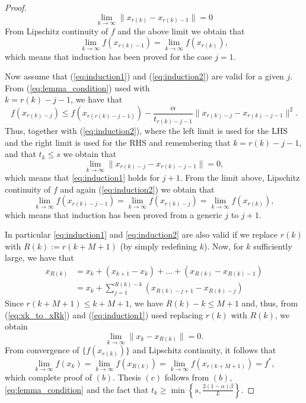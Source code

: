 \documentclass[10pt,a4paper]{article}
\begin{document}
\begin{proof}
	$$ \displaystyle \lim_{k \to \infty} \| x_{r(k)} -x_{r(k)-1}\| = 0$$
	From Lipschitz continuity of $f$ and the above limit we obtain that
	\begin{equation*}
		\displaystyle \lim_{k\to\infty} f(x_{r(k) -1}) = \displaystyle \lim_{k\to\infty} f(x_{r(k) }),
	\end{equation*}
	which means that induction has been proved for the case $j=1$.
	\par Now assume that (\ref{eq:induction1}) and (\ref{eq:induction2}) are valid for a given $j$. From (\ref{eq:lemma_condition}) used with\\ $k = r(k) -j -1$, we have that
	$$ f(x_{r(k) -j}) \leq f(x_{r(r(k)-j -1)}) - \frac{\alpha}{t_{r(k)-j-1}}\| x_{r(k)-j} - x_{r(k)-j-1}\|^2.$$
	Thus, together with (\ref{eq:induction2}), where the left limit is used for the LHS and the right limit is used for the RHS and remembering that $k=  r(k) -j -1$, and that $t_k\leq s$ we obtain that
	$$ \displaystyle \lim_{k \to \infty} \| x_{r(k)-j} - x_{r(k)-j-1} \| = 0,$$
	which means that \eqref{eq:induction1} holds for $j+1$.	From the limit above, Lipschitz continuity of $f$ and again (\ref{eq:induction2}) we obtain that
	\begin{equation*}
		\displaystyle \lim_{k\to\infty} f(x_{r(k)-j-1}) =\displaystyle \lim_{k\to\infty} f(x_{r(k)-j})  = \displaystyle \lim_{k\to\infty} f(x_{r(k)}), 
	\end{equation*}
	which means that induction has been proved from a generic $j$ to $j+1$.
	\par In particular \eqref{eq:induction1} and \eqref{eq:induction2} are also valid if we replace $r(k)$ with $R(k):=r(k+M+1)$ (by simply redefining $k$). Now, for $k$ sufficiently large, we have that
	\begin{equation} \label{eq:xk_to_xRk}
		\begin{split}
			x_{R(k)} &= x_k + (x_{k+1} - x_k) + \dots +(x_{R(k)} - x_{R(k)-1})\\
			&= x_k + \sum_{j=1}^{R(k)-k} \left (x_{R(k) -j +1} - x_{R(k)-j} \right ) 
		\end{split}
	\end{equation}
	Since $r(k+M+1) \leq k + M +1$, we have $R(k) -k  \leq M +1$ and, thus, from (\ref{eq:xk_to_xRk}) and (\ref{eq:induction1}) used replacing $r(k)$ with $R(k)$, we obtain 
	\begin{equation*}
		\displaystyle \lim_{k\to \infty} \| x_k - x_{R(k)}\| = 0.
	\end{equation*}
	From convergence of $\{f(x_{r(k)})\}$ and Lipschitz continuity, it follows that
	$$ \displaystyle\lim_{k\to \infty} f(x_k) = \displaystyle\lim_{k\to \infty}  f(x_{R(k)}) = \displaystyle\lim_{k\to \infty} f(x_{r(k+M+1)}) = f^*,$$
	which complete proof of $(b)$. Thesis $(c)$ follows from $(b)$, \eqref{eq:lemma_condition} and the fact that $t_k \geq \min\left \{s, \frac{2(1-\alpha)\beta}{L}\right \}$. 
\end{proof}
\end{document}
